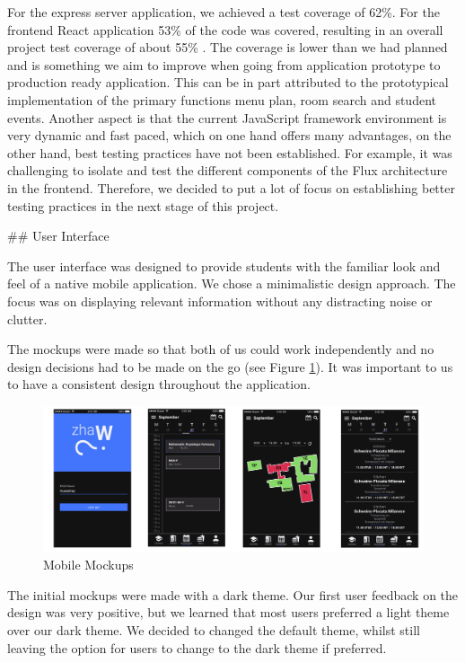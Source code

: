 \begin{markdown}
For the express server application, we achieved a test coverage of 62\%. For the frontend React application 53\% of the code was covered, resulting in an overall project test coverage of about 55\% \cite{OurCoverage}. The coverage is lower than we had planned and is something we aim to improve when going from application prototype to production ready application. This can be in part attributed to the prototypical implementation of the primary functions menu plan, room search and student events. Another aspect is that the current JavaScript framework environment is very dynamic and fast paced, which on one hand offers many advantages, on the other hand, best testing practices have not been established. For example, it was challenging to isolate and test the different components of the Flux architecture in the frontend. Therefore, we decided to put a lot of focus on establishing better testing practices in the next stage of this project.

\newpage

## User Interface

The user interface was designed to provide students with the familiar look and feel of a native mobile application. We chose a minimalistic design approach. The focus was on displaying relevant information without any distracting noise or clutter.

The mockups were made so that both of us could work independently and no design decisions had to be made on the go (see Figure \ref{fig:MobileMockups}). It was important to us to have a consistent design throughout the application.

\begin{figure}[H]
  \includegraphics[width=17.75cm, center]{../../Mockups/Mobile_Mockups.png}
  \caption{\textsf{Mobile Mockups}}
  \label{fig:MobileMockups}
\end{figure}

The initial mockups were made with a dark theme. Our first user feedback on the design was very positive, but we learned that most users preferred a light theme over our dark theme. We decided to changed the default theme, whilst still leaving the option for users to change to the dark theme if preferred.


\end{markdown}
